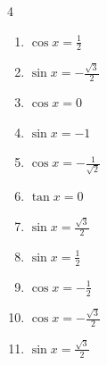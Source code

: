 \begin{multicols}{4}
\begin{enumerate}
  \item $\displaystyle \cos{x}  = \frac{1}{2}$


  \item $\displaystyle \sin{x}  = -\frac{\sqrt{3}}{2}$


  \item $\displaystyle \cos{x}  = 0$


  \item $\displaystyle \sin{x}  = -1$


  \item $\displaystyle \cos{x}  = -\frac{1}{\sqrt{2}}$


  \item $\displaystyle \tan{x}  = 0$

        \phantom{$\displaystyle x = 0 , \pi$}

  \item $\displaystyle \sin{x}  = \frac{\sqrt{3}}{2}$


\columnbreak %

  \item $\displaystyle \sin{x}  = \frac{1}{2}$


  \item $\displaystyle \cos{x}  = -\frac{1}{2}$


  \item $\displaystyle \cos{x}  = -\frac{\sqrt{3}}{2}$


  \item $\displaystyle \sin{x}  = \frac{\sqrt{3}}{2}$



\end{enumerate}
\end{multicols}

